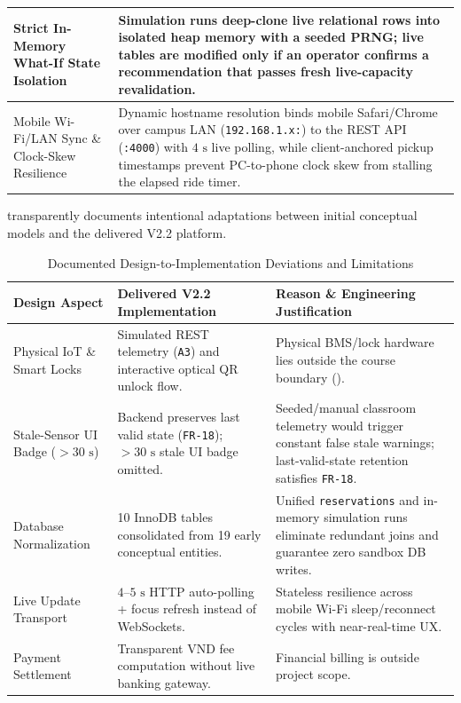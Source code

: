 \begin{table}[H]
\begin{tabularx}{\textwidth}{|L{3.5cm}|Y|}
    \hline
    Strict In-Memory What-If State Isolation & Simulation runs deep-clone live relational rows into isolated heap memory with a seeded PRNG; live tables are modified only if an operator confirms a recommendation that passes fresh live-capacity revalidation. \\
    \hline
    Mobile Wi-Fi/LAN Sync \& Clock-Skew Resilience & Dynamic hostname resolution binds mobile Safari/Chrome over campus LAN (\texttt{192.168.1.x:}) to the REST API (\texttt{:4000}) with $4\text{ s}$ live polling, while client-anchored pickup timestamps prevent PC-to-phone clock skew from stalling the elapsed ride timer. \\
    \hline
  \end{tabularx}
\end{table}

\label{subsec:deviations}
 transparently documents intentional adaptations between initial conceptual models and the delivered V2.2 platform.

\begin{table}[H]
  \centering
  \singlespacing\footnotesize
  \caption{Documented Design-to-Implementation Deviations and Limitations}
  \label{tab:deviations}
  \renewcommand{\arraystretch}{1.23}
  \begin{tabularx}{\textwidth}{|L{3.3cm}|L{4.5cm}|Y|}
    \hline
    \textbf{Design Aspect} & \textbf{Delivered V2.2 Implementation} & \textbf{Reason \& Engineering Justification} \\
    \hline
    Physical IoT \& Smart Locks & Simulated REST telemetry (\texttt{A3}) and interactive optical QR unlock flow. & Physical BMS/lock hardware lies outside the course boundary (). \\
    \hline
    Stale-Sensor UI Badge ($>30\text{ s}$) & Backend preserves last valid state (\texttt{FR-18}); $>30\text{ s}$ stale UI badge omitted. & Seeded/manual classroom telemetry would trigger constant false stale warnings; last-valid-state retention satisfies \texttt{FR-18}. \\
    \hline
    Database Normalization & 10 InnoDB tables consolidated from 19 early conceptual entities. & Unified \texttt{reservations} and in-memory simulation runs eliminate redundant joins and guarantee zero sandbox DB writes. \\
    \hline
    Live Update Transport & $4\text{--}5\text{ s}$ HTTP auto-polling + focus refresh instead of WebSockets. & Stateless resilience across mobile Wi-Fi sleep/reconnect cycles with near-real-time UX. \\
    \hline
    Payment Settlement & Transparent VND fee computation without live banking gateway. & Financial billing is outside project scope. \\
    \hline
  \end{tabularx}
\end{table}
